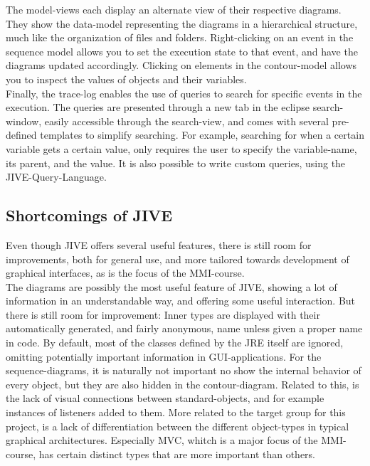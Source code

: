 The model-views each display an alternate view of their respective diagrams.%
They show the data-model representing the diagrams in a hierarchical structure, much like the organization of files and folders.
Right-clicking on an event in the sequence model allows you to set the execution state to that event, and have the diagrams updated accordingly.
Clicking on elements in the contour-model allows you to inspect the values of objects and their variables.
~\\

Finally, the trace-log enables the use of queries to search for specific events in the execution.
The queries are presented through a new tab in the eclipse search-window, easily accessible through the search-view, and comes with several pre-defined templates to simplify searching.
For example, searching for when a certain variable gets a certain value, only requires the user to specify the variable-name, its parent, and the value.
It is also possible to write custom queries, using the JIVE-Query-Language.
~\\

\subsection{Shortcomings of JIVE}\label{jiveShortcomings}

Even though JIVE offers several useful features, there is still room for improvements, both for general use, and more tailored towards development of graphical interfaces, as is the focus of the MMI-course.
~\\

The diagrams are possibly the most useful feature of JIVE, showing a lot of information in an understandable way, and offering some useful interaction.
But there is still room for improvement:
Inner types are displayed with their automatically generated, and fairly anonymous, name unless given a proper name in code.
By default, most of the classes defined by the JRE itself are ignored, omitting potentially important information in GUI-applications.
For the sequence-diagrams, it is naturally not important no show the internal behavior of every object, but they are also hidden in the contour-diagram.
Related to this, is the lack of visual connections between standard-objects, and for example instances of listeners added to them.
More related to the target group for this project, is a lack of differentiation between the different object-types in typical graphical architectures.
Especially MVC, whitch is a major focus of the MMI-course, has certain distinct types that are more important than others.
~\\


